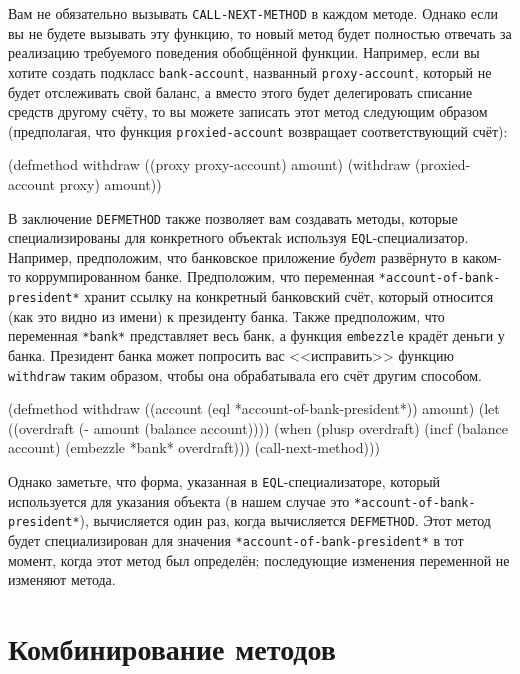 Вам не обязательно вызывать \lstinline{CALL-NEXT-METHOD} в каждом методе.  Однако если вы не
будете вызывать эту функцию, то новый метод будет полностью отвечать за реализацию
требуемого поведения обобщённой функции.  Например, если вы хотите создать подкласс
\lstinline{bank-account}, названный \lstinline{proxy-account}, который не будет отслеживать свой
баланс, а вместо этого будет делегировать списание средств другому счёту, то вы можете
записать этот метод следующим образом (предполагая, что функция \lstinline{proxied-account}
возвращает соответствующий счёт):

\begin{myverb}
(defmethod withdraw ((proxy proxy-account) amount)
  (withdraw (proxied-account proxy) amount))
\end{myverb}

В заключение \lstinline{DEFMETHOD} также позволяет вам создавать методы, которые
специализированы для конкретного объектаk используя \lstinline{EQL}-специализатор.  Например,
предположим, что банковское приложение \textit{будет} развёрнуто в каком-то
коррумпированном банке.  Предположим, что переменная \lstinline{*account-of-bank-president*}
хранит ссылку на конкретный банковский счёт, который относится (как это видно из имени) к
президенту банка.  Также предположим, что переменная \lstinline{*bank*} представляет весь банк,
а функция \lstinline{embezzle} крадёт деньги у банка.  Президент банка может попросить вас
<<исправить>> функцию \lstinline{withdraw} таким образом, чтобы она обрабатывала его счёт
другим способом.

\begin{myverb}
(defmethod withdraw ((account (eql *account-of-bank-president*)) amount)
  (let ((overdraft (- amount (balance account))))
    (when (plusp overdraft)
      (incf (balance account) (embezzle *bank* overdraft)))
  (call-next-method)))
\end{myverb}

Однако заметьте, что форма, указанная в \lstinline{EQL}-специализаторе, который используется
для указания объекта (в нашем случае это \lstinline{*account-of-bank-president*}), вычисляется
один раз, когда вычисляется \lstinline{DEFMETHOD}.  Этот метод будет специализирован для
значения \lstinline{*account-of-bank-president*} в тот момент, когда этот метод был определён;
последующие изменения переменной не изменяют метода.

\section{Комбинирование методов}

